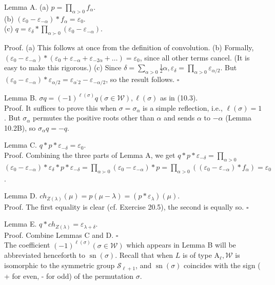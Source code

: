 \documentclass[10pt]{article}
\begin{document}
Lemma A. (a) $p=\prod_{\alpha>0} f_{\alpha}$.\\
(b) $\left(\varepsilon_{0}-\varepsilon_{-\alpha}\right) * f_{\alpha}=\varepsilon_{0}$.\\
(c) $q=\varepsilon_{\delta} * \prod_{\alpha \succ 0}\left(\varepsilon_{0}-\varepsilon_{-\alpha}\right)$.

Proof. (a) This follows at once from the definition of convolution. (b) Formally, $\left(\varepsilon_{0}-\varepsilon_{-\alpha}\right) *\left(\varepsilon_{0}+\varepsilon_{-\alpha}+\varepsilon_{-2 \alpha}+\ldots\right)=\varepsilon_{0}$, since all other terms cancel. (It is easy to make this rigorous.) (c) Since $\delta=\sum_{\alpha>0} \frac{1}{2} \alpha, \varepsilon_{\delta}=\prod_{\alpha>0} \varepsilon_{\alpha / 2}$. But $\left(\varepsilon_{0}-\varepsilon_{-\alpha}\right) * \varepsilon_{\alpha / 2}=\varepsilon_{\alpha^{\prime} 2}-\varepsilon_{-\alpha / 2}$, so the result follows. $\square$

Lemma B. $\sigma q=(-1)^{\ell(\sigma)} q(\sigma \in \mathscr{W}), \ell(\sigma)$ as in (10.3).\\
Proof. It suffices to prove this when $\sigma=\sigma_{\alpha}$ is a simple reflection, i.e., $\ell(\sigma)=1$. But $\sigma_{\alpha}$ permutes the positive roots other than $\alpha$ and sends $\alpha$ to $-\alpha$ (Lemma 10.2B), so $\sigma_{\alpha} q=-q$.

Lemma C. $q * p * \varepsilon_{-\delta}=\varepsilon_{0}$.\\
Proof. Combining the three parts of Lemma A, we get $q * p * \varepsilon_{-\delta}=\prod_{\alpha>0}$ $\left(\varepsilon_{0}-\varepsilon_{-\alpha}\right) * \varepsilon_{\delta} * p * \varepsilon_{-\delta}=\prod_{\alpha \succ 0}\left(\varepsilon_{0}-\varepsilon_{-\alpha}\right) * p=\prod_{\alpha>0}\left(\left(\varepsilon_{0}-\varepsilon_{-\alpha}\right) * f_{\alpha}\right)=\varepsilon_{0}$.

Lemma D. $c h_{Z(\lambda)}(\mu)=p(\mu-\lambda)=\left(p * \varepsilon_{\lambda}\right)(\mu)$.\\
Proof. The first equality is clear (cf. Exercise 20.5), the second is equally so. $\square$

Lemma E. $q * c h_{Z(\lambda)}=\varepsilon_{\lambda+\delta}$.\\
Proof. Combine Lemmas C and D. $\square$\\
The coefficient $(-1)^{\ell(\sigma)}(\sigma \in \mathscr{W})$ which appears in Lemma B will be abbreviated henceforth to $\operatorname{sn}(\sigma)$. Recall that when $L$ is of type $\mathrm{A}_{\ell}, \mathscr{W}$ is isomorphic to the symmetric group $\mathscr{S}_{\ell+1}$, and $\operatorname{sn}(\sigma)$ coincides with the sign ( + for even, - for odd) of the permutation $\sigma$.
\end{document}
